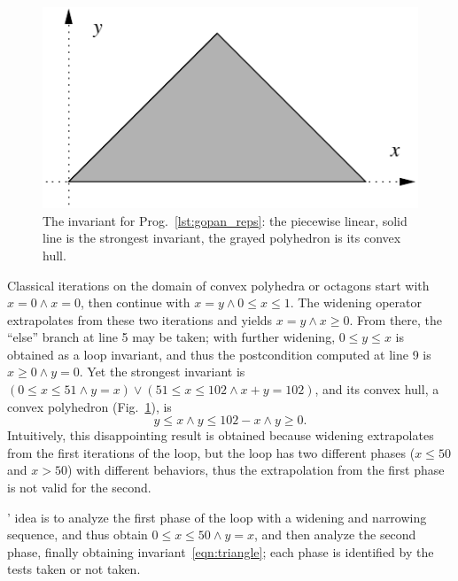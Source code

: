 \documentclass[preprint]{sigplanconf}
\begin{document}
\begin{figure}
\begin{center}
\includegraphics[scale=0.75]{figures/gopan_reps}
\end{center}
\caption{The invariant for Prog.~\ref{lst:gopan_reps}: the piecewise linear, solid line is the strongest invariant, the grayed polyhedron is its convex hull.}
\label{fig:gopan_reps_invariant} 
\end{figure}

Classical iterations on the domain of convex polyhedra \cite{Halbwachs_PhD,CousotHalbwachs78} or octagons \cite{Mine_PhD,DBLP:journals/lisp/Mine06} start with $x = 0 \land x = 0$, then continue with $x = y \land 0 \leq x \leq 1$.
The widening operator extrapolates from these two iterations and yields $x = y \land x \geq 0$.
From there, the ``else'' branch at line 5 may be taken; with further widening, $0 \leq y \leq x$ is obtained as a loop invariant, and thus the postcondition computed at line 9 is $x \geq 0 \land y = 0$.
Yet the strongest invariant is $(0 \leq x \leq 51 \land y = x) \lor (51 \leq x \leq 102 \land x+y=102)$, and its convex hull, a convex polyhedron (Fig.~\ref{fig:gopan_reps_invariant}), is
\begin{equation}
y \leq x \land y \leq 102-x \land y \geq 0.\label{eqn:triangle}
\end{equation}
Intuitively, this disappointing result is obtained because widening extrapolates from the first iterations of the loop, but the loop has two different phases ($x \leq 50$ and $x > 50$) with different behaviors, thus the extrapolation from the first phase is not valid for the second.

\citeauthor{DBLP:conf/sas/GopanR07}' idea is to analyze the first phase of the loop with a widening and narrowing sequence, and thus obtain $0 \leq x \leq 50 \land y = x$, and then analyze the second phase, finally obtaining invariant~\ref{eqn:triangle}; each phase is identified by the tests taken or not taken.
\end{document}
